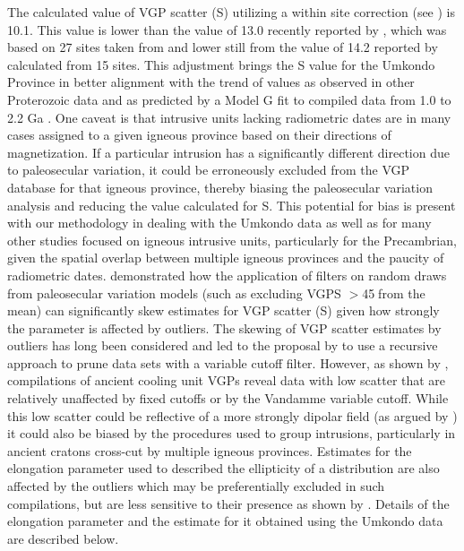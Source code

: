 \documentclass[11pt,letterpaper]{article}
\begin{document}
The calculated value of VGP scatter (S) utilizing a within site correction (see \cite{Biggin2008b}) is 10.1. This value is lower than the value of 13.0 recently reported by \cite{Veikkolainen2014b}, which was based on 27 sites taken from \cite{Gose2006a} and lower still from the value of 14.2 reported by \cite{Smirnov2011b} calculated from 15 sites. This adjustment brings the S value for the Umkondo Province in better alignment with the trend of values as observed in other Proterozoic data and as predicted by a Model G fit to compiled data from 1.0 to 2.2 Ga \citep{Smirnov2011b,Veikkolainen2014b}. One caveat is that intrusive units lacking radiometric dates are in many cases assigned to a given igneous province based on their directions of magnetization. If a particular intrusion has a significantly different direction due to paleosecular variation, it could be erroneously excluded from the VGP database for that igneous province, thereby biasing the paleosecular variation analysis and reducing the value calculated for S. This potential for bias is present with our methodology in dealing with the Umkondo data as well as for many other studies focused on igneous intrusive units, particularly for the Precambrian, given the spatial overlap between multiple igneous provinces and the paucity of radiometric dates. \cite{Deenen2011a} demonstrated how the application of filters on random draws from paleosecular variation models (such as excluding VGPS $>$45\textdegree$\;$from the mean) can significantly skew estimates for VGP scatter (S) given how strongly the parameter is affected by outliers. The skewing of VGP scatter estimates by outliers has long been considered and led to the proposal by \cite{Vandamme1994a} to use a recursive approach to prune data sets with a variable cutoff filter. However, as shown by \cite{Smirnov2011b}, compilations of ancient cooling unit VGPs reveal data with low scatter that are relatively unaffected by fixed cutoffs or by the Vandamme variable cutoff. While this low scatter could be reflective of a more strongly dipolar field (as argued by \citealt{Smirnov2011b}) it could also be biased by the procedures used to group intrusions, particularly in ancient cratons cross-cut by multiple igneous provinces. Estimates for the elongation parameter used to described the ellipticity of a distribution are also affected by the outliers which may be preferentially excluded in such compilations, but are less sensitive to their presence as shown by \cite{Deenen2011a}. Details of the elongation parameter and the estimate for it obtained using the Umkondo data are described below. 
\end{document}
